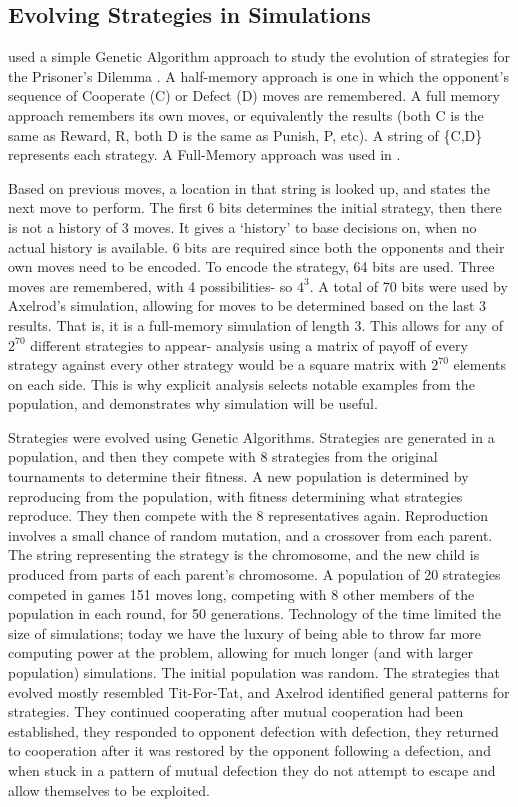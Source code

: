 \documentclass[a4paper,11pt]{article}
\begin{document}
\subsection{Evolving Strategies in Simulations}
\label{sec:axelrodEvolving}
\citet{axelrod1987evolution} used a simple Genetic Algorithm approach to study the evolution of strategies for the Prisoner's Dilemma \citep{back1997handbook}. A half-memory approach is one in which the opponent's sequence of Cooperate (C) or Defect (D) moves are remembered. A full memory approach remembers its own moves, or equivalently the results (both C is the same as Reward, R, both D is the same as Punish, P, etc). A string of \{C,D\} represents each strategy. A Full-Memory approach was used in \citet{axelrod1987evolution}. 

Based on previous moves, a location in that string is looked up, and states the next move to perform. 
The first 6 bits determines the initial strategy, then there is not a history of 3 moves. 
It gives a `history' to base decisions on, when no actual history is available. 
6 bits are required since both the opponents and their own moves need to be encoded. 
To encode the strategy, 64 bits are used. Three moves are remembered, with 4 possibilities- so $4^3$. 
A total of 70 bits were used by Axelrod's simulation, allowing for moves to be determined based on the last 3 results. That is, it is a full-memory simulation of length 3. 
This allows for any of $2^{70}$ different strategies to appear- analysis using a matrix of payoff of every strategy against every other strategy would be a square matrix with $2^{70}$ elements on each side. 
This is why explicit analysis selects notable examples from the population, and demonstrates why simulation will be useful. 

Strategies were evolved using Genetic Algorithms. Strategies are generated in a population, and then they compete with 8 strategies from the original tournaments to determine their fitness. A new population is determined by reproducing from the population, with fitness determining what strategies reproduce. They then compete with the 8 representatives again. 
Reproduction involves a small chance of random mutation, and a crossover from each parent. 
The string representing the strategy is the chromosome, and the new child is produced from parts of each parent's chromosome. A population of 20 strategies competed in games 151 moves long, competing with 8 other members of the population in each round, for 50 generations. 
Technology of the time limited the size of simulations; today we have the luxury of being able to throw far more computing power at the problem, allowing for much longer (and with larger population) simulations. 
The initial population was random. The strategies that evolved mostly resembled Tit-For-Tat, and Axelrod identified general patterns for strategies. They continued cooperating after mutual cooperation had been established, they responded to opponent defection with defection, they returned to cooperation after it was restored by the opponent following a defection, and when stuck in a pattern of mutual defection they do not attempt to escape and allow themselves to be exploited. 
\end{document}

